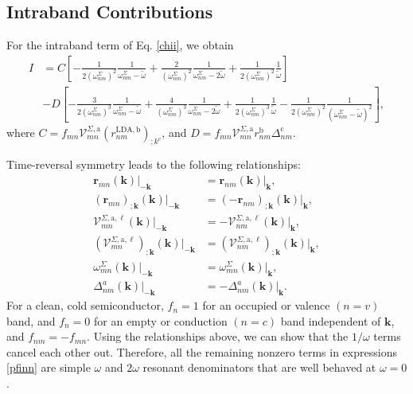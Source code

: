 \subsection{Intraband Contributions}

For the intraband term of Eq. \eqref{chii}, we obtain
\begin{align}\label{pfinn} 
I&= 
C
\left[
-\frac{1}{2(\omega^\Sigma_{nm})^2}\frac{1}{\omega^\Sigma_{nm}-\tilde\omega}
+\frac{2}{(\omega^\Sigma_{nm})^2}\frac{1}{\omega^\Sigma_{nm}-2\tilde\omega}
+\frac{1}{2(\omega^\Sigma_{nm})^2}\frac{1}{\tilde\omega}
\right]
\nonumber\\
&-D
\left[
-\frac{3}{2(\omega^\Sigma_{nm})^3}\frac{1}{\omega^\Sigma_{nm}-\tilde\omega}
+\frac{4}{(\omega^\Sigma_{nm})^3}\frac{1}{\omega^\Sigma_{nm}-2\tilde\omega}
+\frac{1}{2(\omega^\Sigma_{nm})^3}\frac{1}{\tilde\omega}
-\frac{1}{2(\omega^\Sigma_{nm})^2}\frac{1}{(\omega^\Sigma_{nm}-\tilde\omega)^2}
\right],
\end{align} 
where $C = f_{mn}\mathcal{V}^{\Sigma,\mathrm{a}}_{mn}
(r^{\mathrm{LDA},\mathrm{b}}_{nm})_{;k^{\mathrm{c}}}$, and $D =
f_{mn}\mathcal{V}^{\Sigma,\mathrm{a}}_{mn}
r^{\mathrm{b}}_{nm}\Delta^{\mathrm{c}}_{nm}$.

Time-reversal symmetry leads to the following relationships:
\begin{equation}\label{time_reversal}
\begin{split}
   \mathbf{r}_{mn}(\mathbf{k})\vert_{-\mathbf{k}}
&= \mathbf{r}_{nm}(\mathbf{k})\vert_{\mathbf{k}},\\
   (\mathbf{r}_{mn})_{;\mathbf{k}}(\mathbf{k})\vert_{-\mathbf{k}}
&= (-\mathbf{r}_{nm})_{;\mathbf{k}}(\mathbf{k})\vert_{\mathbf{k}},\\
   \mathcal{V}^{\Sigma,\text{a},\ell}_{mn}(\mathbf{k})\vert_{-\mathbf{k}}
&= -\mathbf{\mathcal{V}}_{nm}^{\Sigma,\text{a},\ell}(\mathbf{k})
   \vert_{\mathbf{k}},\\
   (\mathcal{V}^{\Sigma,\text{a},\ell}_{mn})_{;\mathbf{k}}
   (\mathbf{k})\vert_{-\mathbf{k}}
&= (\mathbf{\mathcal{V}}_{nm}^{\Sigma,\text{a},\ell})_{;\mathbf{k}}
   (\mathbf{k})\vert_{\mathbf{k}},\\
   \omega_{mn}^{\Sigma}(\mathbf{k})\vert_{-\mathbf{k}}
&= \omega_{mn}^{\Sigma}(\mathbf{k})\vert_{\mathbf{k}},\\
   \Delta^{a}_{nm}(\mathbf{k})\vert_{-\mathbf{k}}
&= -\Delta^{a}_{nm}(\mathbf{k})\vert_{\mathbf{k}}.
\end{split}
\end{equation}
For a clean, cold semiconductor, $f_{n} = 1$ for an occupied or valence $(n =
v)$ band, and $f_{n} = 0$ for an empty or conduction $(n = c)$ band independent
of $\mathbf{k}$, and $f_{nm} = -f_{mn}$. Using the relationships above, we can
show that the $1/\omega$ terms cancel each other out. Therefore, all the
remaining nonzero terms in expressions \eqref{pfinn} are simple $\omega$ and
$2\omega$ resonant denominators that are well behaved at $\omega = 0$.

